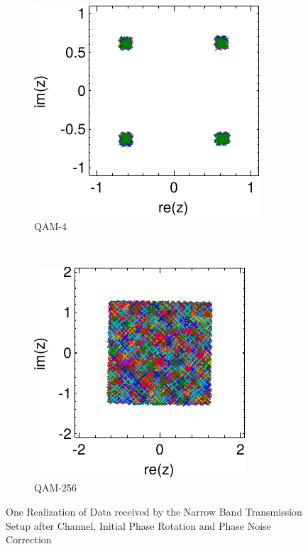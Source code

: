 \begin{figure}[p]
  \centering
  \begin{subfigure}{0.45\textwidth}
    \centering
    \includegraphics[width=\textwidth]{figures/matlab/res_450_qam4_cp_corr_pcorr_initial}
    \caption{\gls{QAM}-4}
    \label{fig:res_450_qam4_cp_corr_pcorr_initial}
  \end{subfigure}
  ~
  \begin{subfigure}{0.45\textwidth}
    \centering
    \includegraphics[width=\textwidth]{figures/matlab/res_450_qam256_cp_corr_pcorr_initial}
    \caption{\gls{QAM}-256}
    \label{fig:res_450_qam256_cp_corr_pcorr_initial}
  \end{subfigure}
  \caption{One Realization of Data received by the Narrow Band
    Transmission Setup after Channel, Initial Phase Rotation
    and Phase Noise Correction}
  \label{fig:res_450_cp_corr_pcorr_initial}
\end{figure}

